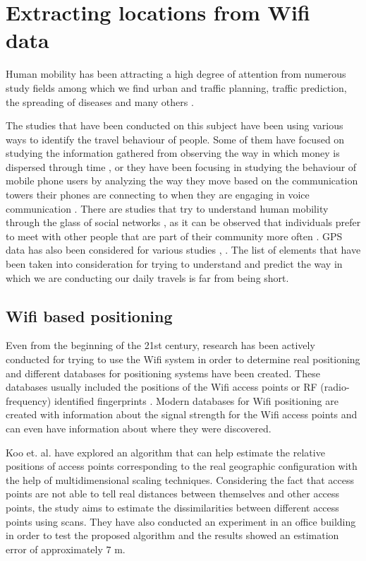 \chapter{Extracting locations from Wifi data}
\label{locations}
Human mobility has been attracting a high degree of attention from numerous
study fields among which we find urban and traffic planning, traffic prediction,
the spreading of diseases and many others \cite{AsgariGB13} \cite{Brockmann08}.

The studies that have been conducted on this subject have been using various
ways to identify the travel behaviour of people. Some of them have focused on
studying the information gathered from observing the way in which money is
dispersed through time \cite{Brockmann06}, or they have been focusing in
studying the behaviour of mobile phone users by analyzing the way they move
based on the communication towers their phones are connecting to when they are
engaging in voice communication \cite{Barabasi08}. There are studies that try to
understand human mobility through the glass of social networks
\cite{yang2010using}, as it can be observed that individuals prefer to meet with
other people that are part of their community more often
\cite{Musolesi:2007:DMM:1317425.1317433}. GPS data has also been considered for
various studies \cite{cuttone2014inferring}, \cite{5657695}. The list of
elements that have been taken into consideration for trying to understand and
predict the way in which we are conducting our daily travels is far from being
short. 

\section{Wifi based positioning}

Even from the beginning of the 21st century, research has been actively
conducted for trying to use the Wifi system in order to determine real
positioning and different databases for positioning systems have been created.
These databases usually included the positions of the Wifi access points or RF
(radio-frequency) identified fingerprints \cite{Chen:2006:PMP:2166283.2166297}
\cite{Cheng:2005:ACM:1067170.1067195} \cite{Youssef:2005:HWL:1067170.1067193}
\cite{bahl2000radar}. Modern databases for Wifi positioning are created with
information about the signal strength for the Wifi access points and can
even have information about where they were discovered.

Koo et. al. \cite{koo2011autonomous} have explored an algorithm that can help
estimate the relative positions of access points corresponding to the real
geographic configuration with the help of multidimensional scaling techniques.
Considering the fact that access points are not able to tell real distances
between themselves and other access points, the study aims to estimate the
dissimilarities between different access points using scans. They have also
conducted an experiment in an office building in order to test the proposed
algorithm and the results showed an estimation error of approximately $7$ m.

